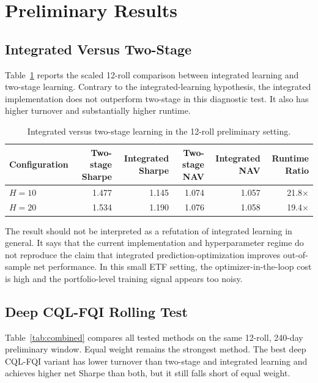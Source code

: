\documentclass[11pt]{article}
\begin{document}
\section{Preliminary Results}

\subsection{Integrated Versus Two-Stage}

Table~\ref{tab:integrated_two_stage} reports the scaled 12-roll comparison between integrated learning and two-stage learning. Contrary to the integrated-learning hypothesis, the integrated implementation does not outperform two-stage in this diagnostic test. It also has higher turnover and substantially higher runtime.

\begin{table}[htbp]
\centering
\caption{Integrated versus two-stage learning in the 12-roll preliminary setting.}
\label{tab:integrated_two_stage}
\begin{tabular}{lrrrrr}
\toprule
Configuration & Two-stage Sharpe & Integrated Sharpe & Two-stage NAV & Integrated NAV & Runtime Ratio \\
\midrule
$H=10$ & 1.477 & 1.145 & 1.074 & 1.057 & 21.8$\times$ \\
$H=20$ & 1.534 & 1.190 & 1.076 & 1.058 & 19.4$\times$ \\
\bottomrule
\end{tabular}
\end{table}

The result should not be interpreted as a refutation of integrated learning in general. It says that the current implementation and hyperparameter regime do not reproduce the claim that integrated prediction-optimization improves out-of-sample net performance. In this small ETF setting, the optimizer-in-the-loop cost is high and the portfolio-level training signal appears too noisy.

\subsection{Deep CQL-FQI Rolling Test}

Table~\ref{tab:combined} compares all tested methods on the same 12-roll, 240-day preliminary window. Equal weight remains the strongest method. The best deep CQL-FQI variant has lower turnover than two-stage and integrated learning and achieves higher net Sharpe than both, but it still falls short of equal weight.
\end{document}
